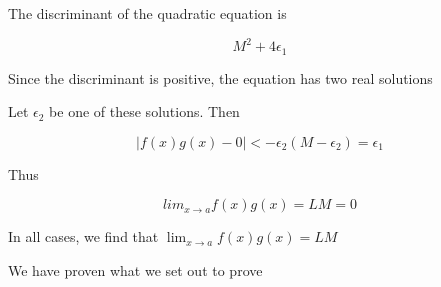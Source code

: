 The discriminant of the quadratic equation is

    $$ M^2 + 4\epsilon_1 $$

Since the discriminant is positive, the equation has two real solutions

Let $\epsilon_2$ be one of these solutions. Then

    $$ |f(x)g(x) - 0| < -\epsilon_2(M - \epsilon_2) = \epsilon_1 $$

Thus

    $$ lim_{x \rightarrow a} f(x)g(x) = LM = 0 $$

In all cases, we find that $\lim_{x \rightarrow a} f(x)g(x) = LM$

We have proven what we set out to prove
